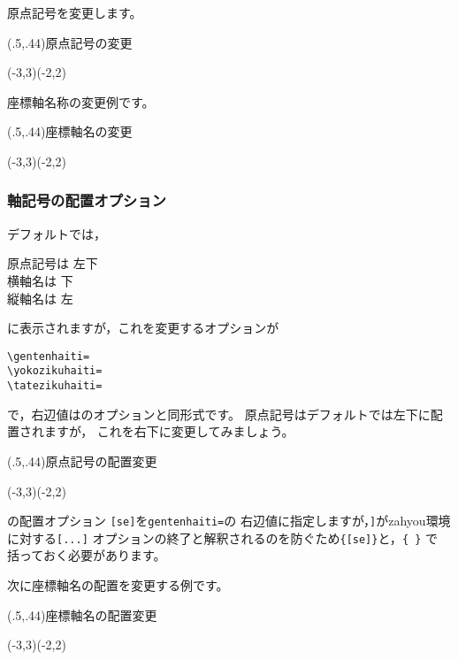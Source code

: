 原点記号を変更します。
\begin{showEx}(.5,.44){原点記号の変更}
\begin{zahyou}%
  [%
    ul=8mm,
    gentenkigou=O$'$
  ]%
  (-3,3)(-2,2)%
\end{zahyou}%
\end{showEx}

座標軸名称の変更例です。
\begin{showEx}(.5,.44){座標軸名の変更}
\begin{zahyou}%
  [%
    ul=8mm,
    yokozikukigou=$a$,
    tatezikukigou=$b$
  ]%
  (-3,3)(-2,2)%
\end{zahyou}%
\end{showEx}

\subsubsection{軸記号の配置オプション}
デフォルトでは，
\begin{jquote}
原点記号は 左下\\
横軸名は   下\\
縦軸名は   左
\end{jquote}
に表示されますが，これを変更するオプションが
\begin{jquote}
\begin{verbatim}
\gentenhaiti=
\yokozikuhaiti=
\tatezikuhaiti=
\end{verbatim}
\end{jquote}
で，右辺値はのオプションと同形式です。
原点記号はデフォルトでは左下に配置されますが，
これを右下に変更してみましょう。

\begin{showEx}(.5,.44){原点記号の配置変更}
\begin{zahyou}%
  [%
    ul=8mm,
    gentenhaiti={[se]}
  ]%
  (-3,3)(-2,2)%
\end{zahyou}%
\end{showEx}

の配置オプション \verb+[se]+を\texttt{gentenhaiti=}の
右辺値に指定しますが，\verb+]+が\textsf{zahyou}環境に対する\verb+[...]+
オプションの終了と解釈されるのを防ぐため\verb+{[se]}+と，\verb+{ }+ で
括っておく必要があります。

次に座標軸名の配置を変更する例です。

\begin{showEx}(.5,.44){座標軸名の配置変更}
\begin{zahyou}%
  [%
    ul=8mm,
    yokozikuhaiti={[e]},
    tatezikuhaiti={(-1pt,0)[r]}
  ]%
  (-3,3)(-2,2)%
\end{zahyou}%
\end{showEx}

